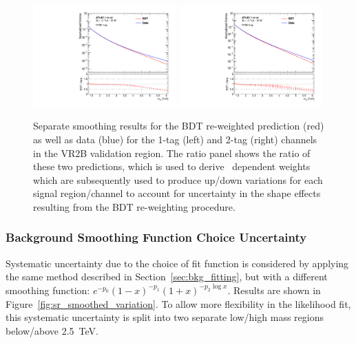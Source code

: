 \begin{figure}[htbp!]
\begin{center}
\includegraphics[width=0.49\textwidth]{VHqqbb_BDTShapeSystematic_VR2B_1tag.pdf}
\includegraphics[width=0.49\textwidth]{VHqqbb_BDTShapeSystematic_VR2B_2tag.pdf}
\end{center}
\caption{Separate smoothing results for the BDT re-weighted prediction (red) as well as data (blue) for the 1-tag (left) and 2-tag (right) channels in the VR2B validation region.
    The ratio panel shows the ratio of these two predictions, which is used to derive \mvh\ dependent weights which are subsequently used to produce up/down variations for each signal region/channel to account for uncertainty in the shape effects resulting from the BDT re-weighting procedure.
}
\label{fig:bdt_shape_syst}
\end{figure}

\subsubsection{Background Smoothing Function Choice Uncertainty}
Systematic uncertainty due to the choice of fit function is considered by applying the same method described in Section~\ref{sec:bkg_fitting}, but with a different smoothing function: $e^{-p_0} \left(1 - x\right)^{-p_1} \left(1+x\right)^{-p_2 \log{x}}$.
Results are shown in Figure~\ref{fig:sr_smoothed_variation}.
To allow more flexibility in the likelihood fit, this systematic uncertainty is split into two separate low/high mass regions below/above 2.5~TeV.

